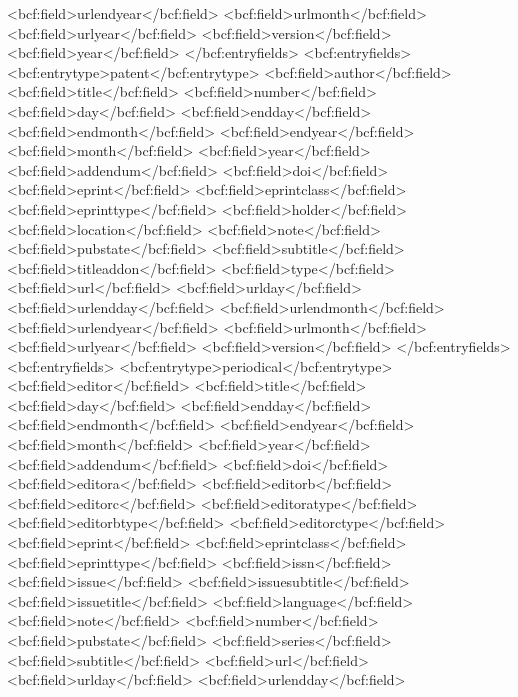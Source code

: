       <bcf:field>urlendyear</bcf:field>
      <bcf:field>urlmonth</bcf:field>
      <bcf:field>urlyear</bcf:field>
      <bcf:field>version</bcf:field>
      <bcf:field>year</bcf:field>
    </bcf:entryfields>
    <bcf:entryfields>
      <bcf:entrytype>patent</bcf:entrytype>
      <bcf:field>author</bcf:field>
      <bcf:field>title</bcf:field>
      <bcf:field>number</bcf:field>
      <bcf:field>day</bcf:field>
      <bcf:field>endday</bcf:field>
      <bcf:field>endmonth</bcf:field>
      <bcf:field>endyear</bcf:field>
      <bcf:field>month</bcf:field>
      <bcf:field>year</bcf:field>
      <bcf:field>addendum</bcf:field>
      <bcf:field>doi</bcf:field>
      <bcf:field>eprint</bcf:field>
      <bcf:field>eprintclass</bcf:field>
      <bcf:field>eprinttype</bcf:field>
      <bcf:field>holder</bcf:field>
      <bcf:field>location</bcf:field>
      <bcf:field>note</bcf:field>
      <bcf:field>pubstate</bcf:field>
      <bcf:field>subtitle</bcf:field>
      <bcf:field>titleaddon</bcf:field>
      <bcf:field>type</bcf:field>
      <bcf:field>url</bcf:field>
      <bcf:field>urlday</bcf:field>
      <bcf:field>urlendday</bcf:field>
      <bcf:field>urlendmonth</bcf:field>
      <bcf:field>urlendyear</bcf:field>
      <bcf:field>urlmonth</bcf:field>
      <bcf:field>urlyear</bcf:field>
      <bcf:field>version</bcf:field>
    </bcf:entryfields>
    <bcf:entryfields>
      <bcf:entrytype>periodical</bcf:entrytype>
      <bcf:field>editor</bcf:field>
      <bcf:field>title</bcf:field>
      <bcf:field>day</bcf:field>
      <bcf:field>endday</bcf:field>
      <bcf:field>endmonth</bcf:field>
      <bcf:field>endyear</bcf:field>
      <bcf:field>month</bcf:field>
      <bcf:field>year</bcf:field>
      <bcf:field>addendum</bcf:field>
      <bcf:field>doi</bcf:field>
      <bcf:field>editora</bcf:field>
      <bcf:field>editorb</bcf:field>
      <bcf:field>editorc</bcf:field>
      <bcf:field>editoratype</bcf:field>
      <bcf:field>editorbtype</bcf:field>
      <bcf:field>editorctype</bcf:field>
      <bcf:field>eprint</bcf:field>
      <bcf:field>eprintclass</bcf:field>
      <bcf:field>eprinttype</bcf:field>
      <bcf:field>issn</bcf:field>
      <bcf:field>issue</bcf:field>
      <bcf:field>issuesubtitle</bcf:field>
      <bcf:field>issuetitle</bcf:field>
      <bcf:field>language</bcf:field>
      <bcf:field>note</bcf:field>
      <bcf:field>number</bcf:field>
      <bcf:field>pubstate</bcf:field>
      <bcf:field>series</bcf:field>
      <bcf:field>subtitle</bcf:field>
      <bcf:field>url</bcf:field>
      <bcf:field>urlday</bcf:field>
      <bcf:field>urlendday</bcf:field>
